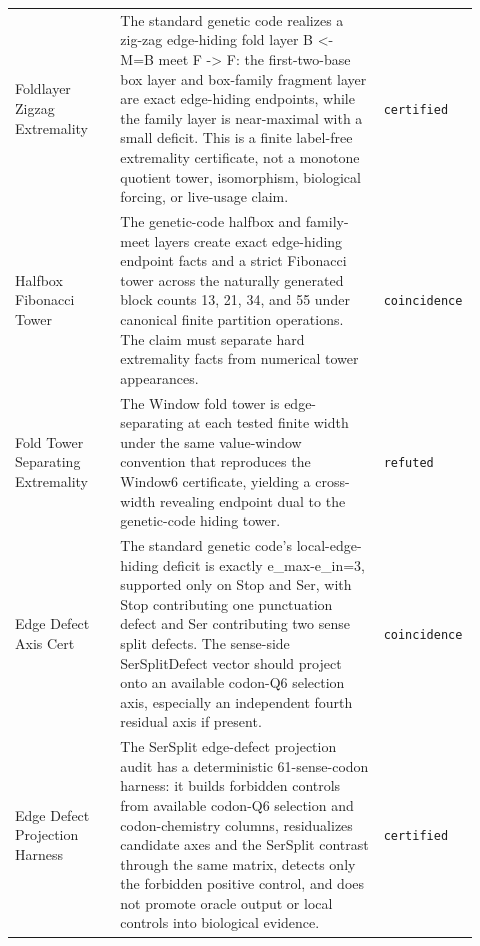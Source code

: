 \begin{longtable}{>{\raggedright\arraybackslash}p{0.22\linewidth}>{\raggedright\arraybackslash}p{0.55\linewidth}>{\raggedright\arraybackslash}p{0.15\linewidth}}
Foldlayer Zigzag Extremality & The standard genetic code realizes a zig-zag edge-hiding fold layer B <- M=B meet F -> F: the first-two-base box layer and box-family fragment layer are exact edge-hiding endpoints, while the family layer is near-maximal with a small deficit. This is a finite label-free extremality certificate, not a monotone quotient tower, isomorphism, biological forcing, or live-usage claim. & \texttt{certified} \\
Halfbox Fibonacci Tower & The genetic-code halfbox and family-meet layers create exact edge-hiding endpoint facts and a strict Fibonacci tower across the naturally generated block counts 13, 21, 34, and 55 under canonical finite partition operations. The claim must separate hard extremality facts from numerical tower appearances. & \texttt{coincidence} \\
Fold Tower Separating Extremality & The Window fold tower is edge-separating at each tested finite width under the same value-window convention that reproduces the Window6 certificate, yielding a cross-width revealing endpoint dual to the genetic-code hiding tower. & \texttt{refuted} \\
Edge Defect Axis Cert & The standard genetic code's local-edge-hiding deficit is exactly e\_max-e\_in=3, supported only on Stop and Ser, with Stop contributing one punctuation defect and Ser contributing two sense split defects. The sense-side SerSplitDefect vector should project onto an available codon-Q6 selection axis, especially an independent fourth residual axis if present. & \texttt{coincidence} \\
Edge Defect Projection Harness & The SerSplit edge-defect projection audit has a deterministic 61-sense-codon harness: it builds forbidden controls from available codon-Q6 selection and codon-chemistry columns, residualizes candidate axes and the SerSplit contrast through the same matrix, detects only the forbidden positive control, and does not promote oracle output or local controls into biological evidence. & \texttt{certified} \\

\end{longtable}
